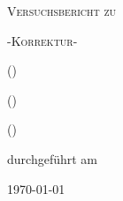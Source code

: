 
\makeatletter
\newcommand*{\protokollemailparse}[1]{%
	\@for\@tempa:=#1\do{%
		\normalsize\email{\@tempa}\\
	}%
}
\makeatother

\begin{titlepage}
	\centering
	{\scshape\LARGE Versuchsbericht zu \par}
	\vspace{1cm}
	{\scshape\huge \varName\par}
	\vspace{1cm}
	{\scshape\huge -Korrektur- \par}
	\vspace{2.5cm}
	{\LARGE \varGruppe\par}
	\vspace{0.5cm}
	{\large \varNameA {} (\varEmailA) \par}
	{\large \varNameB {} (\varEmailB) \par}
	{\large \varNameC {} (\varEmailC) \par}
	\vfill
	durchgeführt am \varDatum\par
	{\large \varBetreuer}
	\vfill
	{\large \today\par}
\end{titlepage}


\maketitle
